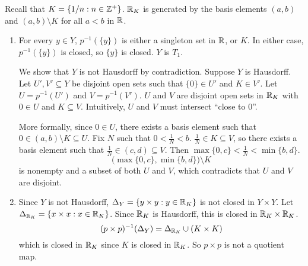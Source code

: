 Recall that $K = \{1/n : n \in \mathbb Z^+\}$. $\mathbb R_K$ is generated by the basis elements $(a,b)$ and $(a,b) \setminus K$ for all $a < b$ in $\mathbb R$.
\begin{enumerate}
\item For every $y \in Y$, $p^{-1}(\{y\})$ is either a singleton set in $\mathbb R$, or $K$. In either case, $p^{-1}(\{y\})$ is closed, so $\{y\}$ is closed. $Y$ is $T_1$.

We show that $Y$ is not Hausdorff by contradiction. Suppose $Y$ is Hausdorff. Let $U', V' \subseteq Y$ be disjoint open sets such that $\{0\} \in U'$ and $K \in V'$. Let $U = p^{-1}(U')$ and $V = p^{-1}(V')$. $U$ and $V$ are disjoint open sets in $\mathbb R_K$ with $0 \in U$ and $K \subseteq V$. Intuitively, $U$ and $V$ must intersect ``close to 0''.

More formally, since $0 \in U$, there exists a basis element such that $0 \in (a,b) \setminus K \subseteq U$. Fix $N$ such that $0 < \frac1N < b$. $\frac1N \in K \subseteq V$, so there exists a basis element such that $\frac1N \in (c,d) \subseteq V$. Then $\max\{0,c\} < \frac1N < \min\{b,d\}$. 
\[\bigl(\max\{0,c\}, \min\{b,d\} \bigr) \setminus K\]
is nonempty and a subset of both $U$ and $V$, which contradicts that $U$ and $V$ are disjoint.

\item Since $Y$ is not Hausdorff, $\Delta_Y = \{y \times y : y \in \mathbb R_K\}$ is not closed in $Y \times Y$. Let $\Delta_{\mathbb R_K} = \{x \times x : x \in \mathbb R_K\}$. Since $\mathbb R_K$ is Hausdorff, this is closed in $\mathbb R_K \times \mathbb R_K$.
\[(p \times p)^{-1}(\Delta_Y) = \Delta_{\mathbb R_K} \cup (K \times K)\]
which is closed in $\mathbb R_K$ since $K$ is closed in $\mathbb R_K$. So $p \times p$ is not a quotient map.
\end{enumerate}
